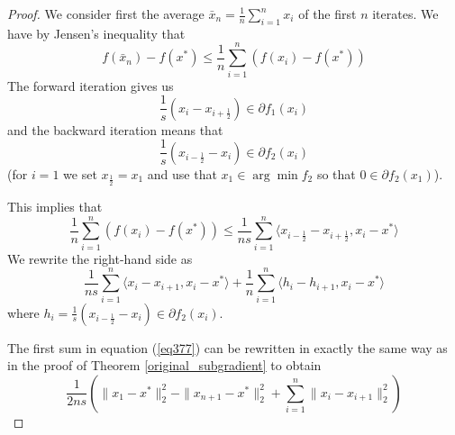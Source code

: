 \begin{proof}
 We consider first the average $\bar{x}_n = \frac{1}{n}\sum_{i = 1}^n x_i$ of the first $n$ iterates.
 We have by Jensen's inequality that
 \begin{equation}
  f(\bar{x}_n) - f(x^*) \leq \frac{1}{n}\displaystyle\sum_{i = 1}^n (f(x_i) - f(x^*))
 \end{equation}
 The forward iteration gives us 
 $$\frac{1}{s}(x_i - x_{i + \frac{1}{2}}) \in \partial f_1(x_i)$$ 
 and the backward iteration means that 
 $$\frac{1}{s}(x_{i - \frac{1}{2}} - x_i)\in\partial f_2(x_i)$$ 
 (for $i = 1$ we set $x_{\frac{1}{2}} = x_1$ and
 use that $x_1\in \arg\min f_2$ so that $0\in \partial f_2(x_1)$).
 
 This implies that
 \begin{equation}\label{eq373}
  \frac{1}{n}\displaystyle\sum_{i = 1}^n (f(x_i) - f(x^*)) \leq \frac{1}{ns}\displaystyle\sum_{i = 1}^n \langle x_{i - \frac{1}{2}} - x_{i + \frac{1}{2}}, x_i - x^*\rangle
 \end{equation}
 We rewrite the right-hand side as
 \begin{equation}\label{eq377}
  \frac{1}{ns}\displaystyle\sum_{i = 1}^n \langle x_i - x_{i + 1}, x_i - x^*\rangle + \frac{1}{n} \displaystyle\sum_{i = 1}^n\langle h_i - h_{i+1}, x_i - x^*\rangle
 \end{equation}
 where $h_i = \frac{1}{s}(x_{i - \frac{1}{2}} - x_i)\in\partial f_2(x_i)$.
 
 The first sum in equation (\ref{eq377}) can be rewritten in exactly the same way as in the proof of Theorem \ref{original_subgradient}
 to obtain
 \begin{equation}\label{eq384}
  \frac{1}{2ns}\left(\|x_1 - x^*\|_2^2 - \|x_{n+1} - x^*\|_2^2 + \displaystyle\sum_{i = 1}^n \|x_i - x_{i+1}\|_2^2\right)
 \end{equation}


\end{proof}
